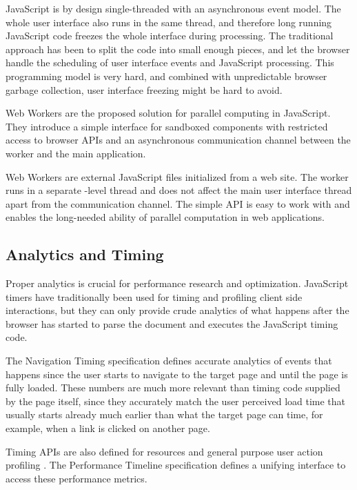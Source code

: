JavaScript is by design single-threaded with an asynchronous event
model. The whole user interface also runs in the same thread, and
therefore long running JavaScript code freezes the whole interface
during processing. The traditional approach has been to split the code
into small enough pieces, and let the browser handle the scheduling of
user interface events and JavaScript processing. This programming
model is very hard, and combined with unpredictable browser garbage
collection, user interface freezing might be hard to
avoid. \cite{souders2009even}

Web Workers are the proposed solution for parallel computing in
JavaScript. They introduce a simple interface for sandboxed components
with restricted access to browser APIs and an asynchronous
communication channel between the worker and the main
application. \cite{WebWorkers}

Web Workers are external JavaScript files initialized from a web
site. The worker runs in a separate -level thread and does
not affect the main user interface thread apart from the communication
channel. The simple API is easy to work with and enables the
long-needed ability of parallel computation in web applications.

\subsection{Analytics and Timing}

Proper analytics is crucial for performance research and
optimization. JavaScript timers have traditionally been used for
timing and profiling client side interactions, but they can only
provide crude analytics of what happens after the browser has started
to parse the document and executes the JavaScript timing code.

The Navigation Timing specification \cite{NavigationTiming} defines
accurate analytics of events that happens since the user starts to
navigate to the target page and until the page is fully loaded. These
numbers are much more relevant than timing code supplied by the page
itself, since they accurately match the user perceived load time that
usually starts already much earlier than what the target page can
time, for example, when a link is clicked on another page.

Timing APIs are also defined for resources \cite{ResourceTiming} and
general purpose user action profiling \cite{UserTiming}. The
Performance Timeline specification \cite{PerformanceTimeline} defines
a unifying interface to access these performance metrics.

